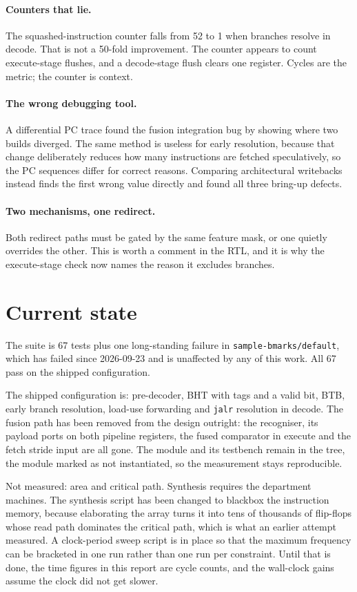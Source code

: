 \documentclass[11pt]{article}
\begin{document}
\paragraph{Counters that lie.} The squashed-instruction counter falls from 52 to 1 when branches
resolve in decode. That is not a 50-fold improvement. The counter appears to count execute-stage
flushes, and a decode-stage flush clears one register. Cycles are the metric; the counter is
context.

\paragraph{The wrong debugging tool.} A differential PC trace found the fusion integration bug
by showing where two builds diverged. The same method is useless for early resolution, because
that change deliberately reduces how many instructions are fetched speculatively, so the PC
sequences differ for correct reasons. Comparing architectural writebacks instead finds the first
wrong value directly and found all three bring-up defects.

\paragraph{Two mechanisms, one redirect.} Both redirect paths must be gated by the same feature
mask, or one quietly overrides the other. This is worth a comment in the RTL, and it is why the
execute-stage check now names the reason it excludes branches.

\section{Current state}

The suite is 67 tests plus one long-standing failure in \texttt{sample-bmarks/default}, which has
failed since 2026-09-23 and is unaffected by any of this work. All 67 pass on the shipped
configuration.

The shipped configuration is: pre-decoder, BHT with tags and a valid bit, BTB, early branch
resolution, load-use forwarding and \texttt{jalr} resolution in decode. The fusion path has been
removed from the design outright: the recogniser, its payload ports on both pipeline registers,
the fused comparator in execute and the fetch stride input are all gone. The module and its
testbench remain in the tree, the module marked as not instantiated, so the measurement stays
reproducible.

Not measured: area and critical path. Synthesis requires the department machines. The synthesis
script has been changed to blackbox the instruction memory, because elaborating the array turns
it into tens of thousands of flip-flops whose read path dominates the critical path, which is
what an earlier attempt measured. A clock-period sweep script is in place so that the maximum
frequency can be bracketed in one run rather than one run per constraint. Until that is done,
the time figures in this report are cycle counts, and the wall-clock gains assume the clock did
not get slower.
\end{document}
